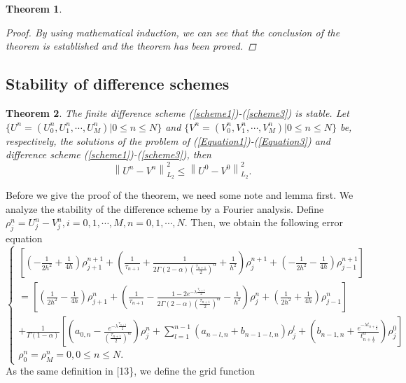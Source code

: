 \documentclass[10pt, reqno]{amsart}
\newtheorem{thm}{\bf Theorem}
\newenvironment{theorem}{\begin{thm}} {\end{thm}}
\theoremstyle{remark}
\theoremstyle{definition}
\numberwithin{table}{section}
\begin{document}
\begin{theorem}
\begin{proof}
By using mathematical induction,  we can see that the conclusion of the theorem is established and the theorem has been proved. 
    \end{proof}
\end{theorem}


\subsection{Stability of difference schemes}
\begin{theorem}\label{stable}
    The finite difference scheme (\ref{scheme1})-(\ref{scheme3}) is stable. Let $\{U^n=(U_0^n, U_1^n, \cdots, U_M^n) | 0 \leq n \leq N\}$ and $\{V^n=(V_0^n, V_1^n, \cdots, V_M^n) | 0 \leq n \leq N\}$ be, 
respectively,  the solutions of the problem of (\ref{Equation1})-(\ref{Equation3}) and difference scheme (\ref{scheme1})-(\ref{scheme3}), then 
$$
\left\|U^n-V^n\right\|_{L_2}^2 \leq \left\|U^0-V^0\right\|_{L_2}^2. 
$$
\end{theorem}
Before we give the proof of the theorem, we need some note and lemma first. We analyze the stability of the difference scheme by a Fourier analysis. Define $\rho_j^n=U_j^n-V_j^n, i=0, 1, \cdots, M, n=0, 1, \cdots, N$. Then,  we obtain the following error equation
\begin{equation}\label{errorQ}
\left\{\begin{array}{l}
{\left[\left(-\frac{1}{2 h^2}+\frac{1}{4h}\right) \rho_{j+1}^{n+1}+\left(\frac{1}{\tau_{n+1}}+\frac{1}{2\Gamma(2-\alpha)(\frac{\tau_{n+1}}{2})^\alpha}+\frac{1}{h^2}\right) \rho_j^{n+1}+\left(-\frac{1}{2 h^2}-\frac{1}{4h}\right) \rho_{j-1}^{n+1}\right]} \\
=\left[\left(\frac{1}{2 h^2}-\frac{1}{4h}\right) \rho_{j+1}^{n}+\left(\frac{1}{\tau_{n+1}}-\frac{1-2e^{-\lambda \frac{\tau_{n+1}}{2}}}{2\Gamma(2-\alpha)(\frac{\tau_{n+1}}{2})^\alpha}-\frac{1}{h^2}\right) \rho_j^{n}+\left(\frac{1}{2 h^2}+\frac{1}{4h}\right) \rho_{j-1}^{n}\right] \\
+\frac{1}{\Gamma(1-\alpha)}\left[(a_{0, n}-\frac{e^{-\lambda \frac{\tau_{n+1}}{2}}}{(\frac{\tau_{n+1}}{2})^\alpha}) \rho_j^n+\sum\limits_{l=1}^{n-1} \left(a_{n-l, n}+b_{n-1-l, n}\right) \rho_j^l+(b_{n-1, n}+\frac{e^{-\lambda t_{n+\frac{1}{2}}}}{t_{n+\frac{1}{2}}^\alpha}) \rho_j^0\right] \\
\rho_0^n=\rho_M^n=0, 0 \leq n \leq N . 
\end{array}\right. 
\end{equation}
As the same definition in [13\},  we define the grid function 
\end{document}
